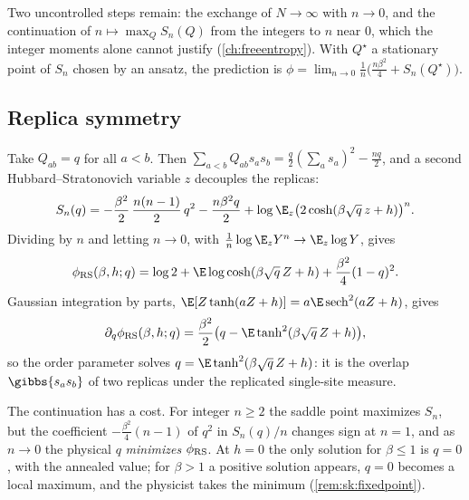 \begin{refsection}
Two uncontrolled steps remain: the exchange of $N\to\infty$ with $n\to0$, and the continuation of $n\mapsto\max_QS_n(Q)$ from the integers to $n$ near $0$, which the integer moments alone cannot justify (\cref{ch:freeentropy}). With $Q^\star$ a stationary point of $S_n$ chosen by an ansatz, the prediction is $\phi=\lim_{n\to0}\frac1n\bigl(\frac{n\beta^2}4+S_n(Q^\star)\bigr)$.

\subsection{Replica symmetry}\label{sec:sk:rs}

\begin{heuristic}
Take $Q_{ab}=q$ for all $a<b$. Then $\sum_{a<b}Q_{ab}s_as_b=\frac q2(\sum_as_a)^2-\frac{nq}2$, and a second Hubbard--Stratonovich variable $z$ decouples the replicas:
\[
S_n(q)=-\frac{\beta^2}2\,\frac{n(n-1)}2\,q^2-\frac{n\beta^2q}2+\log\E_z\bigl(2\cosh(\beta\sqrt q\,z+h)\bigr)^n.
\]
Dividing by $n$ and letting $n\to0$, with $\frac1n\log\E_zY^n\to\E_z\log Y$, gives
\begin{equation}\label{eq:sk:phirs}
\skRS(\beta,h;q)=\log2+\E\log\cosh(\beta\sqrt q\,Z+h)+\frac{\beta^2}4(1-q)^2.
\end{equation}
Gaussian integration by parts, $\E[Z\tanh(aZ+h)]=a\E\sksech^2(aZ+h)$, gives
\begin{equation}\label{eq:sk:fixedpoint}
\partial_q\skRS(\beta,h;q)=\frac{\beta^2}2\bigl(q-\E\tanh^2(\beta\sqrt q\,Z+h)\bigr),
\end{equation}
so the order parameter solves $q=\E\tanh^2(\beta\sqrt q\,Z+h)$: it is the overlap $\gibbs{s_as_b}$ of two replicas under the replicated single-site measure.
\end{heuristic}

The continuation has a cost. For integer $n\ge2$ the saddle point maximizes $S_n$, but the coefficient $-\frac{\beta^2}4(n-1)$ of $q^2$ in $S_n(q)/n$ changes sign at $n=1$, and as $n\to0$ the physical $q$ \emph{minimizes} $\phi_{\mathrm{RS}}$. At $h=0$ the only solution for $\beta\le1$ is $q=0$, with the annealed value; for $\beta>1$ a positive solution appears, $q=0$ becomes a local maximum, and the physicist takes the minimum (\cref{rem:sk:fixedpoint}).


\end{refsection}
